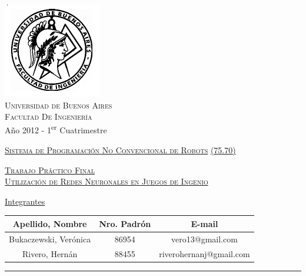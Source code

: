 \documentclass[12pt,titlepage]{article}
\begin{document}
\begin{titlepage}

\thispagestyle{empty}

\begin{center}
\includegraphics[scale=0.55]{./imgs/fiuba-logo.png}\\
\large{\textsc{Universidad de Buenos Aires}}\\
\large{\textsc{Facultad De Ingeniería}}\\
\small{Año 2012 - 1\textsuperscript{er} Cuatrimestre}
\end{center}

\vfill

\begin{center}

\Large{\underline{\textsc{Sistema de Programaci\'on No Convencional de Robots}}}
\Large{\underline{\textsc{(75.70)}}}

\vfill


\Large{\underline{\textsc{Trabajo Pr\'actico Final}}} \\
\Large{\underline{\textsc{Utilizaci\'on de Redes Neuronales en Juegos de Ingenio}}}
\vfill
 
\Large\underline{Integrantes} \linebreak\linebreak

\large\addtolength{\tabcolsep}{-3pt}
\begin{tabular}{|| c | c | c ||}
\hline
\textbf{Apellido, Nombre} & \textbf{Nro. Padrón} & \textbf{E-mail} \\
\hline
Bukaczewski, Verónica & 86954 & vero13@gmail.com \\
\hline
Rivero, Hern\'an & 88455 & riverohernanj@gmail.com \\
\hline
\end{tabular}
\end{center}

\vfill

\hrule
\vspace{0.2cm}


\end{titlepage}
\end{document}
